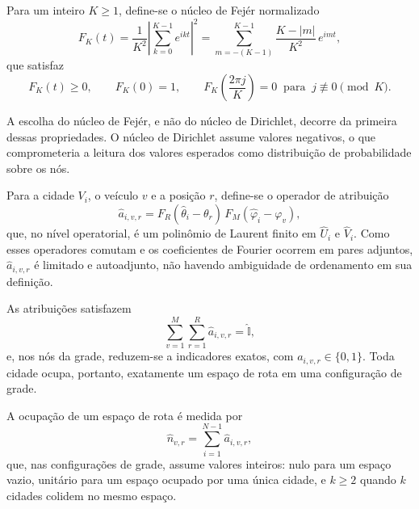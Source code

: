         Para um inteiro $K \geq 1$, define-se o núcleo de Fejér normalizado \cite{?}
        \begin{equation}\label{eq:form_mod_fejer}
            F_K(t) = \frac{1}{K^2} \left| \sum_{k=0}^{K-1} e^{ikt} \right|^2
            = \sum_{m=-(K-1)}^{K-1} \frac{K - |m|}{K^2}\, e^{imt} ,
        \end{equation}
        \noindent que satisfaz
        \begin{equation}\label{eq:form_mod_fejer_props}
            F_K(t) \geq 0 , \qquad F_K(0) = 1 , \qquad
            F_K\!\left( \frac{2\pi j}{K} \right) = 0 \;\; \text{para} \;\; j \not\equiv 0 \!\!\pmod{K} .
        \end{equation}

        A escolha do núcleo de Fejér, e não do núcleo de Dirichlet, decorre da primeira dessas propriedades. O núcleo de Dirichlet assume valores negativos, o que comprometeria a leitura dos valores esperados como distribuição de probabilidade sobre os nós.

        Para a cidade $V_i$, o veículo $v$ e a posição $r$, define-se o operador de atribuição
        \begin{equation}\label{eq:form_mod_atribuicao}
            \hat{a}_{i,v,r} = F_R(\hat{\theta}_i - \theta_r)\, F_M(\hat{\varphi}_i - \varphi_v) ,
        \end{equation}
        \noindent que, no nível operatorial, é um polinômio de Laurent finito em $\hat{U}_i$ e $\hat{V}_i$. Como esses operadores comutam e os coeficientes de Fourier ocorrem em pares adjuntos, $\hat{a}_{i,v,r}$ é limitado e autoadjunto, não havendo ambiguidade de ordenamento em sua definição.

        As atribuições satisfazem
        \begin{equation}\label{eq:form_mod_completude}
            \sum_{v=1}^{M} \sum_{r=1}^{R} \hat{a}_{i,v,r} = \hat{\mathbb{I}} ,
        \end{equation}
        \noindent e, nos nós da grade, reduzem-se a indicadores exatos, com $a_{i,v,r} \in \{0, 1\}$. Toda cidade ocupa, portanto, exatamente um espaço de rota em uma configuração de grade.

        A ocupação de um espaço de rota é medida por
        \begin{equation}\label{eq:form_mod_ocupacao}
            \hat{n}_{v,r} = \sum_{i=1}^{N-1} \hat{a}_{i,v,r} ,
        \end{equation}
        \noindent que, nas configurações de grade, assume valores inteiros: nulo para um espaço vazio, unitário para um espaço ocupado por uma única cidade, e $k \geq 2$ quando $k$ cidades colidem no mesmo espaço.

